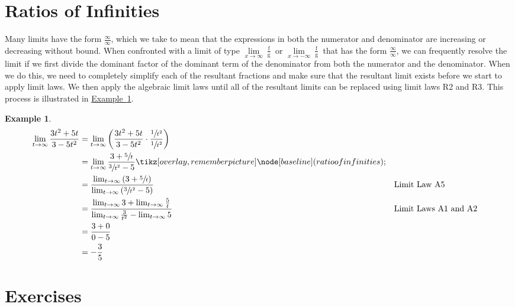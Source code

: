 \documentclass[12pt,]{book}
\theoremstyle{plain}
\theoremstyle{definition}
\newtheorem{example}[theorem]{Example}
\numberwithin{equation}{section}
\newcommand{\tikzmark}[1]{\tikz[overlay,remember picture] \node[baseline] (#1) {};}%
\newcommand{\fe}[2]{\mathop{{#1}{\left(#2\right)}}}
\begin{document}
\section[Ratios of Infinities]{Ratios of Infinities}\label{section-ratios-of-infinities}
Many limits have the form \(\frac{\infty}{\infty}\), which we take to mean that the expressions in both the numerator and denominator are increasing or decreasing without bound. When confronted with a limit of type \(\lim\limits_{x\to\infty}\frac{\fe{f}{x}}{\fe{g}{x}}\) or \(\lim\limits_{x\to-\infty}\frac{\fe{f}{x}}{\fe{g}{x}}\) that has the form \(\frac{\infty}{\infty}\), we can frequently resolve the limit if we first divide the dominant factor of the dominant term of the denominator from both the numerator and the denominator. When we do this, we need to completely simplify each of the resultant fractions and make sure that the resultant limit exists before we start to apply limit laws. We then apply the algebraic limit laws until all of the resultant limits can be replaced using limit laws R2 and R3. This process is illustrated in \hyperref[example-ratio-of-infinities]{Example~\ref*{example-ratio-of-infinities}}.%
\begin{example}\label{example-ratio-of-infinities}
\begin{align*}
\lim_{t\to\infty}\frac{3t^2+5t}{3-5t^2}&=\lim_{t\to\infty}\left(\frac{3t^2+5t}{3-5t^2}\cdot\frac{\sfrac{1}{t^2}}{\sfrac{1}{t^2}}\right)\\
&=\lim_{t\to\infty}\frac{3+\sfrac{5}{t}}{\sfrac{3}{t^2}-5}\tikzmark{ratio of infinities}\\
&=\frac{\lim_{t\to\infty}\left(3+\sfrac{5}{t}\right)}{\lim_{t\to\infty}\left(\sfrac{3}{t^2}-5\right)}&&\text{Limit Law A5}\\
&=\frac{\lim_{t\to\infty}3+\lim_{t\to\infty}\frac{5}{t}}{\lim_{t\to\infty}\frac{3}{t^2}-\lim_{t\to\infty}5}&&\text{Limit Laws A1 and A2}\\
&=\frac{3+0}{0-5}\\
&=-\frac{3}{5}
\end{align*}%
\end{example}
\typeout{************************************************}
\typeout{************************************************}
\section*{Exercises}\label{exercises-9}
\end{document}
